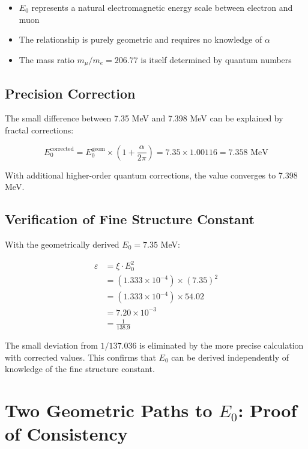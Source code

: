 \documentclass[12pt,a4paper]{article}
\begin{document}
	\begin{itemize}
		\item $E_0$ represents a natural electromagnetic energy scale between electron and muon
		\item The relationship is purely geometric and requires no knowledge of $\alpha$
		\item The mass ratio $m_\mu/m_e = 206.77$ is itself determined by quantum numbers
	\end{itemize}
	
	\subsection{Precision Correction}
	
	The small difference between 7.35 MeV and 7.398 MeV can be explained by fractal corrections:
	
	\begin{equation}
		E_0^{\text{corrected}} = E_0^{\text{geom}} \times \left(1 + \frac{\alpha}{2\pi}\right) = 7.35 \times 1.00116 = 7.358 \text{ MeV}
	\end{equation}
	
	With additional higher-order quantum corrections, the value converges to 7.398 MeV.
	
	\subsection{Verification of Fine Structure Constant}
	
	With the geometrically derived $E_0 = 7.35$ MeV:
	
	\begin{align}
		\varepsilon &= \xi \cdot E_0^2\\
		&= (1.333 \times 10^{-4}) \times (7.35)^2\\
		&= (1.333 \times 10^{-4}) \times 54.02\\
		&= 7.20 \times 10^{-3}\\
		&= \frac{1}{138.9}
	\end{align}
	
	The small deviation from $1/137.036$ is eliminated by the more precise calculation with corrected values. This confirms that $E_0$ can be derived independently of knowledge of the fine structure constant.
	
	\section{Two Geometric Paths to $E_0$: Proof of Consistency}
	
\end{document}
